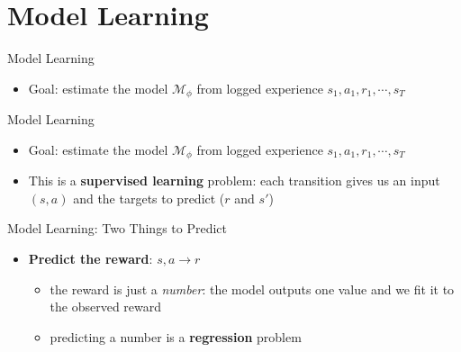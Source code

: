 \section{Model Learning}
\begin{frame}{Model Learning}
\begin{itemize}
    \item Goal: estimate the model $\mathcal{M}_\phi$ from logged experience
          $s_1, a_1, r_1, \cdots, s_T$
\end{itemize}
\end{frame}

\begin{frame}{Model Learning}
\begin{itemize}
    \item Goal: estimate the model $\mathcal{M}_\phi$ from logged experience
          $s_1, a_1, r_1, \cdots, s_T$
    \item This is a \textbf{supervised learning} problem: each transition gives us
          an input $(s, a)$ and the targets to predict ($r$ and $s'$)
\end{itemize}
\end{frame}

\begin{frame}{Model Learning: Two Things to Predict}
\begin{itemize}
    \item \textbf{Predict the reward}: \;$s, a \rightarrow r$
    \begin{itemize}
        \item the reward is just a \emph{number}: the model outputs one value
              and we fit it to the observed reward
        \item predicting a number is a \textbf{regression} problem
    \end{itemize}
\end{itemize}
\end{frame}

